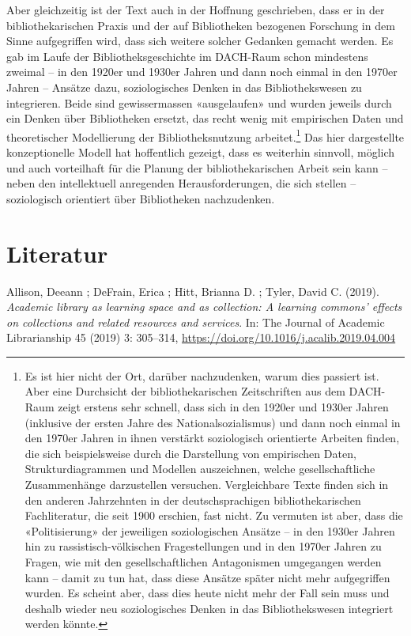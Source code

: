 \documentclass[a4paper,
fontsize=11pt,
oneside,
numbers=noperiodatend,
parskip=half-,
bibliography=totoc,
final
]{scrartcl}
\begin{document}
Aber gleichzeitig ist der Text auch in der Hoffnung geschrieben, dass er
in der bibliothekarischen Praxis und der auf Bibliotheken bezogenen
Forschung in dem Sinne aufgegriffen wird, dass sich weitere solcher
Gedanken gemacht werden. Es gab im Laufe der Bibliotheksgeschichte im
DACH-Raum schon mindestens zweimal -- in den 1920er und 1930er Jahren
und dann noch einmal in den 1970er Jahren -- Ansätze dazu,
soziologisches Denken in das Bibliothekswesen zu integrieren. Beide sind
gewissermassen «ausgelaufen» und wurden jeweils durch ein Denken über
Bibliotheken ersetzt, das recht wenig mit empirischen Daten und
theoretischer Modellierung der Bibliotheksnutzung arbeitet.\footnote{Es
  ist hier nicht der Ort, darüber nachzudenken, warum dies passiert ist.
  Aber eine Durchsicht der bibliothekarischen Zeitschriften aus dem
  DACH-Raum zeigt erstens sehr schnell, dass sich in den 1920er und
  1930er Jahren (inklusive der ersten Jahre des Nationalsozialismus) und
  dann noch einmal in den 1970er Jahren in ihnen verstärkt soziologisch
  orientierte Arbeiten finden, die sich beispielsweise durch die
  Darstellung von empirischen Daten, Strukturdiagrammen und Modellen
  auszeichnen, welche gesellschaftliche Zusammenhänge darzustellen
  versuchen. Vergleichbare Texte finden sich in den anderen Jahrzehnten
  in der deutschsprachigen bibliothekarischen Fachliteratur, die seit
  1900 erschien, fast nicht. Zu vermuten ist aber, dass die
  «Politisierung» der jeweiligen soziologischen Ansätze -- in den 1930er
  Jahren hin zu rassistisch-völkischen Fragestellungen und in den 1970er
  Jahren zu Fragen, wie mit den gesellschaftlichen Antagonismen
  umgegangen werden kann -- damit zu tun hat, dass diese Ansätze später
  nicht mehr aufgegriffen wurden. Es scheint aber, dass dies heute nicht
  mehr der Fall sein muss und deshalb wieder neu soziologisches Denken
  in das Bibliothekswesen integriert werden könnte.} Das hier
dargestellte konzeptionelle Modell hat hoffentlich gezeigt, dass es
weiterhin sinnvoll, möglich und auch vorteilhaft für die Planung der
bibliothekarischen Arbeit sein kann -- neben den intellektuell
anregenden Herausforderungen, die sich stellen -- soziologisch
orientiert über Bibliotheken nachzudenken.

\hypertarget{literatur}{%
\section{Literatur}\label{literatur}}

Allison, Deeann ; DeFrain, Erica ; Hitt, Brianna D. ; Tyler, David C.
(2019). \emph{Academic library as learning space and as collection: A
learning commons' effects on collections and related resources and
services}. In: The Journal of Academic Librarianship 45 (2019) 3:
305--314, \url{https://doi.org/10.1016/j.acalib.2019.04.004}
\end{document}
